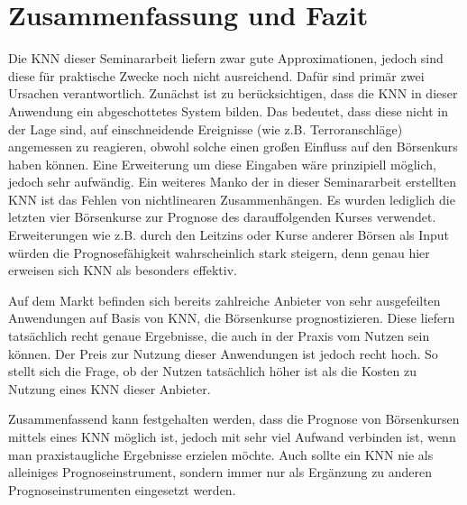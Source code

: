 \chapter{Zusammenfassung und Fazit}
\label{cha:Zusammenfassung und Fazit}

Die KNN dieser Seminararbeit liefern zwar gute Approximationen, jedoch sind diese für praktische Zwecke noch nicht ausreichend. Dafür sind primär zwei Ursachen verantwortlich. Zunächst ist zu berücksichtigen, dass die KNN in dieser Anwendung ein abgeschottetes System bilden. Das bedeutet, dass diese nicht in der Lage sind, auf einschneidende Ereignisse (wie z.B. Terroranschläge) angemessen zu reagieren, obwohl solche einen großen Einfluss auf den Börsenkurs haben können. Eine Erweiterung um diese Eingaben wäre prinzipiell möglich, jedoch sehr aufwändig. Ein weiteres Manko der in dieser Seminararbeit erstellten KNN ist das Fehlen von nichtlinearen Zusammenhängen. Es wurden lediglich die letzten vier Börsenkurse zur Prognose des darauffolgenden Kurses verwendet. Erweiterungen wie z.B. durch den Leitzins oder Kurse anderer Börsen als Input würden die Prognosefähigkeit wahrscheinlich stark steigern, denn genau hier erweisen sich KNN als besonders effektiv.
 
Auf dem Markt befinden sich bereits zahlreiche Anbieter von sehr ausgefeilten Anwendungen auf Basis von KNN, die Börsenkurse prognostizieren. Diese liefern tatsächlich recht genaue Ergebnisse, die auch in der Praxis vom Nutzen sein können. Der Preis zur Nutzung dieser Anwendungen ist jedoch recht hoch. So stellt sich die Frage, ob der Nutzen tatsächlich höher ist als die Kosten zu Nutzung eines KNN dieser Anbieter.

Zusammenfassend kann festgehalten werden, dass die Prognose von Börsenkursen mittels eines KNN möglich ist, jedoch mit sehr viel Aufwand verbinden ist, wenn man praxistaugliche Ergebnisse erzielen möchte. Auch sollte ein KNN nie als alleiniges Prognoseinstrument, sondern immer nur als Ergänzung zu anderen Prognoseinstrumenten eingesetzt werden.
